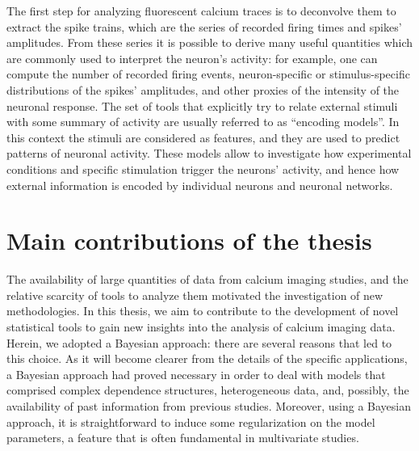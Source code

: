 The first step for analyzing fluorescent calcium traces is to deconvolve them to extract the spike trains, which are the series of recorded firing times and spikes' amplitudes.
From these series it is possible to derive many useful quantities which are commonly used to interpret the neuron's activity: for example, one can compute the number of recorded firing events, neuron-specific or stimulus-specific distributions of the spikes' amplitudes, and other proxies of the intensity of the neuronal response.
The set of tools that explicitly try to relate external stimuli with some summary of activity are usually referred to as ``encoding models''. In this context the stimuli are considered as features, and they are used to predict patterns of neuronal activity. These models allow to investigate how experimental conditions and specific stimulation trigger the neurons' activity, and hence how external information is encoded by individual neurons and neuronal networks.



\section*{Main contributions of the thesis}
The availability of large quantities of data from calcium imaging studies, and the relative scarcity of tools to analyze them motivated the investigation of new methodologies.
In this thesis, we aim to contribute to the development of novel statistical tools to gain new insights into the analysis of calcium imaging data.
Herein, we adopted a Bayesian approach: there are several reasons that led to this choice. As it will become clearer from the details of the specific applications, a Bayesian approach had proved necessary in order to deal with models that comprised complex dependence structures, heterogeneous data, and, possibly, the availability of past information from previous studies. Moreover, using a Bayesian approach, it is straightforward to induce some regularization on the model parameters, a feature that is often fundamental in multivariate studies.

